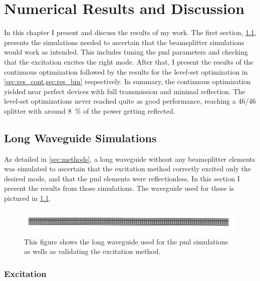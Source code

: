\chapter{Numerical Results and Discussion}

In this chapter I present and discuss the results of my work.
The first section, \cref{sec:long_waveguide}, presents the simulations needed to
ascertain that the beamsplitter simulations would work as intended.
This includes tuning the \gls{pml} parameters and checking that the excitation
excites the right mode.
After that, I present the results of the continuous optimization followed by the
results for the level-set optimization in \cref{sec:res_cont,sec:res_bin}
respectively.
In summary, the continuous optimization yielded near perfect devices with full
transmission and minimal reflection.
The level-set optimizations never reached quite as good performance, reaching a
46/46 splitter with around 8~\% of the power getting reflected.

\section{Long Waveguide Simulations}\label{sec:long_waveguide}

As detailed in \cref{sec:methods}, a long waveguide without any beamsplitter
elements was simulated to ascertain that the excitation method correctly excited
only the desired mode, and that the \gls{pml} elements were reflectionless.
In this section I present the results from those simulations.
The waveguide used for these is pictured in \cref{fig:long_waveguide}.

\begin{figure}[htpb]
	\centering
	\includegraphics[width=\textwidth]{chapters/results/long_waveguide_geom.png}
	\caption{%
		This figure shows the long waveguide used for the \gls{pml} simulations
		as wells as validating the excitation method.
	}%
	\label{fig:long_waveguide}
\end{figure}

\subsection{Excitation}

